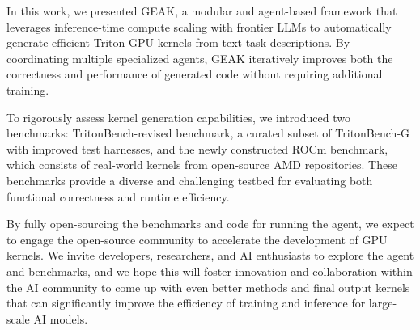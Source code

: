 In this work, we presented GEAK, a modular and agent-based framework that leverages inference-time compute scaling with frontier LLMs to automatically generate efficient Triton GPU kernels from text task descriptions. By coordinating multiple specialized agents, GEAK iteratively improves both the correctness and performance of generated code without requiring additional training.

To rigorously assess kernel generation capabilities, we introduced two benchmarks: TritonBench-revised benchmark, a curated subset of TritonBench-G with improved test harnesses, and the newly constructed ROCm benchmark, which consists of real-world kernels from open-source AMD repositories. These benchmarks provide a diverse and challenging testbed for evaluating both functional correctness and runtime efficiency.

By fully open-sourcing the benchmarks and code for running the agent, we expect to engage the open-source community to accelerate the development of GPU kernels. We invite developers, researchers, and AI enthusiasts to explore the agent and benchmarks, and we hope this will foster innovation and collaboration within the AI community to come up with even better methods and final output kernels that can significantly improve the efficiency of training and inference for large-scale AI models.